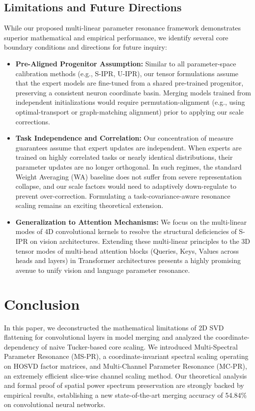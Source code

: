 \documentclass{article}
\theoremstyle{plain}
\theoremstyle{definition}
\theoremstyle{remark}
\begin{document}
\subsection{Limitations and Future Directions}
While our proposed multi-linear parameter resonance framework demonstrates superior mathematical and empirical performance, we identify several core boundary conditions and directions for future inquiry:
\begin{itemize}
    \item \textbf{Pre-Aligned Progenitor Assumption:} Similar to all parameter-space calibration methods (e.g., S-IPR, U-IPR), our tensor formulations assume that the expert models are fine-tuned from a shared pre-trained progenitor, preserving a consistent neuron coordinate basin. Merging models trained from independent initializations would require permutation-alignment (e.g., using optimal-transport or graph-matching alignment) prior to applying our scale corrections.
    \item \textbf{Task Independence and Correlation:} Our concentration of measure guarantees assume that expert updates are independent. When experts are trained on highly correlated tasks or nearly identical distributions, their parameter updates are no longer orthogonal. In such regimes, the standard Weight Averaging (WA) baseline does not suffer from severe representation collapse, and our scale factors would need to adaptively down-regulate to prevent over-correction. Formulating a task-covariance-aware resonance scaling remains an exciting theoretical extension.
    \item \textbf{Generalization to Attention Mechanisms:} We focus on the multi-linear modes of 4D convolutional kernels to resolve the structural deficiencies of S-IPR on vision architectures. Extending these multi-linear principles to the 3D tensor modes of multi-head attention blocks (Queries, Keys, Values across heads and layers) in Transformer architectures presents a highly promising avenue to unify vision and language parameter resonance.
\end{itemize}

\section{Conclusion}
In this paper, we deconstructed the mathematical limitations of 2D SVD flattening for convolutional layers in model merging and analyzed the coordinate-dependency of naive Tucker-based core scaling. We introduced Multi-Spectral Parameter Resonance (MS-PR), a coordinate-invariant spectral scaling operating on HOSVD factor matrices, and Multi-Channel Parameter Resonance (MC-PR), an extremely efficient slice-wise channel scaling method. Our theoretical analysis and formal proof of spatial power spectrum preservation are strongly backed by empirical results, establishing a new state-of-the-art merging accuracy of 54.84\% on convolutional neural networks.
\end{document}
